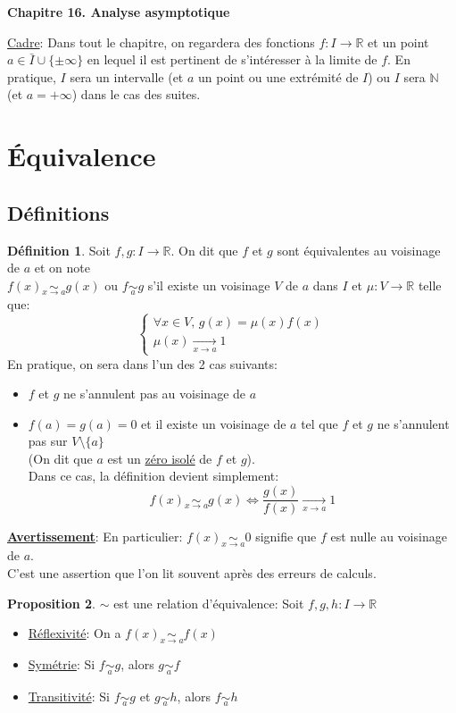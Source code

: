 \documentclass[10pt,a4paper]{article}
\theoremstyle{definition}
\newtheorem{proposition}{Proposition}[section]
\newtheorem{definition}[proposition]{Définition}
\DeclareMathOperator*{\eqv}{\sim}
\begin{document}
\renewcommand{\labelitemi}{$*$}
\renewcommand{\labelenumi}{(\roman{enumi})}
\begin{center}
{\Large \textbf{Chapitre 16. Analyse asymptotique}}
\end{center}
\uline{Cadre}: Dans tout le chapitre, on regardera des fonctions $f: I \to \mathbb{R}$ et un point $a \in \bar{I} \cup \{  \pm\infty \}$ en lequel il est pertinent de s'intéresser à la limite de $f$. En pratique, $I$ sera un intervalle (et $a$ un point ou une extrémité de $I$) ou $I$ sera $\mathbb{N}$ (et $a = +\infty$) dans le cas des suites.

\section{Équivalence}
\subsection{Définitions}
\begin{definition}
Soit $f,g: I \to \mathbb{R}$. On dit que $f$ et $g$ sont équivalentes au voisinage de $a$ et on note \\
$f(x) \eqv\limits_{x \to a} g(x)$ ou $f \eqv\limits_{a} g$ s'il existe un voisinage $V$ de $a$ dans $I$ et $\mu: V \to \mathbb{R}$ telle que:
\[ \begin{cases}
\forall x \in V ,\, g(x) = \mu(x) f(x) \\
\mu(x) \xrightarrow[x \to a]{} 1
\end{cases} \]
En pratique, on sera dans l'un des 2 cas suivants:
\begin{itemize}
\item $f$ et $g$ ne s'annulent pas au voisinage de $a$
\item $f(a) = g(a) = 0$ et il existe un voisinage de $a$ tel que $f$ et $g$ ne s'annulent pas sur $V \setminus \{ a \}$ \\
(On dit que $a$ est un  \uline{zéro isolé} de $f$ et $g$). \\
Dans ce cas, la définition devient simplement:
\[ f(x) \eqv\limits_{x \to a} g(x) \iff \frac{g(x)}{f(x)} \xrightarrow[x \to a]{} 1 \]
\end{itemize}
\end{definition}
\medskip
\noindent \uline{\textbf{Avertissement}}: En particulier: $f(x) \eqv\limits_{x \to a} 0$ signifie que $f$ est nulle au voisinage de $a$. \\
C'est une assertion que l'on lit souvent après des erreurs de calculs.
\begin{proposition}
$\sim$ est une relation d'équivalence: Soit $f,g,h : I \to \mathbb{R}$
\begin{itemize}
\item \uline{Réflexivité}: On a $f(x) \eqv\limits_{x \to a} f(x)$
\item \uline{Symétrie}: Si $f \eqv\limits_{a} g$, alors $g \eqv\limits_{a} f$
\item \uline{Transitivité}: Si $f \eqv\limits_{a} g$ et $g \eqv\limits_{a} h$, alors $f \eqv\limits_{a} h$
\end{itemize}
\end{proposition}
\end{document}
